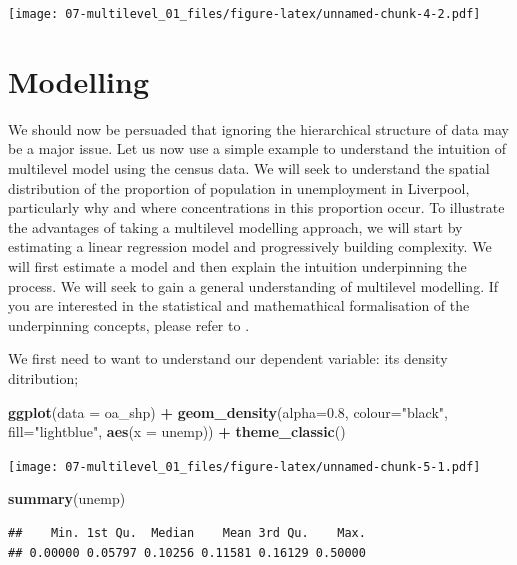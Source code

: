 \documentclass[
]{book}
\newenvironment{Shaded}{\begin{snugshade}}{\end{snugshade}}
\newcommand{\DataTypeTok}[1]{\textcolor[rgb]{0.13,0.29,0.53}{#1}}
\newcommand{\FloatTok}[1]{\textcolor[rgb]{0.00,0.00,0.81}{#1}}
\newcommand{\KeywordTok}[1]{\textcolor[rgb]{0.13,0.29,0.53}{\textbf{#1}}}
\newcommand{\NormalTok}[1]{#1}
\newcommand{\OperatorTok}[1]{\textcolor[rgb]{0.81,0.36,0.00}{\textbf{#1}}}
\newcommand{\StringTok}[1]{\textcolor[rgb]{0.31,0.60,0.02}{#1}}
\begin{document}
\texttt{[image: 07-multilevel\_01\_files/figure-latex/unnamed-chunk-4-2.pdf]}

\hypertarget{modelling}{%
\section{Modelling}\label{modelling}}

We should now be persuaded that ignoring the hierarchical structure of data may be a major issue. Let us now use a simple example to understand the intuition of multilevel model using the census data. We will seek to understand the spatial distribution of the proportion of population in unemployment in Liverpool, particularly why and where concentrations in this proportion occur. To illustrate the advantages of taking a multilevel modelling approach, we will start by estimating a linear regression model and progressively building complexity. We will first estimate a model and then explain the intuition underpinning the process. We will seek to gain a general understanding of multilevel modelling. If you are interested in the statistical and mathemathical formalisation of the underpinning concepts, please refer to \citet{Gelman_Hill_2006_book}.

We first need to want to understand our dependent variable: its density ditribution;

\begin{Shaded}
\begin{Highlighting}[]
\KeywordTok{ggplot}\NormalTok{(}\DataTypeTok{data =}\NormalTok{ oa_shp) }\OperatorTok{+}
\KeywordTok{geom_density}\NormalTok{(}\DataTypeTok{alpha=}\FloatTok{0.8}\NormalTok{, }\DataTypeTok{colour=}\StringTok{"black"}\NormalTok{, }\DataTypeTok{fill=}\StringTok{"lightblue"}\NormalTok{, }\KeywordTok{aes}\NormalTok{(}\DataTypeTok{x =}\NormalTok{ unemp)) }\OperatorTok{+}
\StringTok{   }\KeywordTok{theme_classic}\NormalTok{()}
\end{Highlighting}
\end{Shaded}

\texttt{[image: 07-multilevel\_01\_files/figure-latex/unnamed-chunk-5-1.pdf]}

\begin{Shaded}
\begin{Highlighting}[]
\KeywordTok{summary}\NormalTok{(unemp)}
\end{Highlighting}
\end{Shaded}

\begin{verbatim}
##    Min. 1st Qu.  Median    Mean 3rd Qu.    Max. 
## 0.00000 0.05797 0.10256 0.11581 0.16129 0.50000
\end{verbatim}
\end{document}
